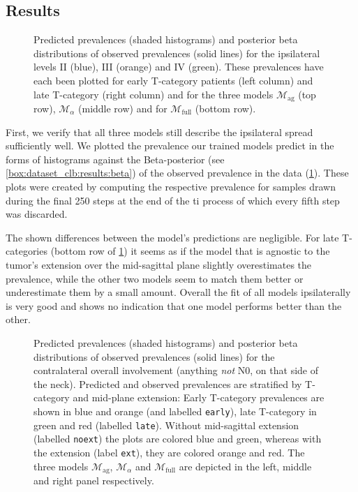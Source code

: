 \documentclass[\relativeRoot/main.tex]{subfiles}
\begin{document}
\subsection{Results}
\label{subsec:bilateral:model_comp:results}

\begin{figure}
    \def\svgwidth{1.0\textwidth}
    
    \caption[
        Comparison of ipsilateral prevalences
    ]{
        Predicted prevalences (shaded histograms) and posterior beta distributions of observed prevalences (solid lines) for the ipsilateral levels II (blue), III (orange) and IV (green). These prevalences have each been plotted for early T-category patients (left column) and late T-category (right column) and for the three models $\mathcal{M}_\text{ag}$ (top row), $\mathcal{M}_\alpha$ (middle row) and for $\mathcal{M}_\text{full}$ (bottom row).
    }
    \label{fig:bilateral:model_comp:ipsi}
\end{figure}

First, we verify that all three models still describe the ipsilateral spread sufficiently well. We plotted the prevalence our trained models predict in the forms of histograms against the Beta-posterior (see \cref{box:dataset_clb:results:beta}) of the observed prevalence in the data (\cref{fig:bilateral:model_comp:ipsi}). These plots were created by computing the respective prevalence for samples drawn during the final 250 steps at the end of the \gls{ti} process of which every fifth step was discarded.

The shown differences between the model's predictions are negligible. For late T-categories (bottom row of \cref{fig:bilateral:model_comp:ipsi}) it seems as if the model that is agnostic to the tumor's extension over the mid-sagittal plane slightly overestimates the prevalence, while the other two models seem to match them better or underestimate them by a small amount. Overall the fit of all models ipsilaterally is very good and shows no indication that one model performs better than the other.

\begin{figure}
    \def\svgwidth{1.0\textwidth}
    
    \caption[
        Comparison of contralateral prevalences
    ]{
        Predicted prevalences (shaded histograms) and posterior beta distributions of observed prevalences (solid lines) for the contralateral overall involvement (anything \emph{not} N0, on that side of the neck). Predicted and observed prevalences are stratified by T-category and mid-plane extension: Early T-category prevalences are shown in blue and orange (and labelled \texttt{early}), late T-category in green and red (labelled \texttt{late}). Without mid-sagittal extension (labelled \texttt{noext}) the plots are colored blue and green, whereas with the extension (label \texttt{ext}), they are colored orange and red. The three models $\mathcal{M}_\text{ag}$, $\mathcal{M}_\alpha$ and $\mathcal{M}_\text{full}$ are depicted in the left, middle and right panel respectively.
    }
    \label{fig:bilateral:model_comp:contra}
\end{figure}
\end{document}

